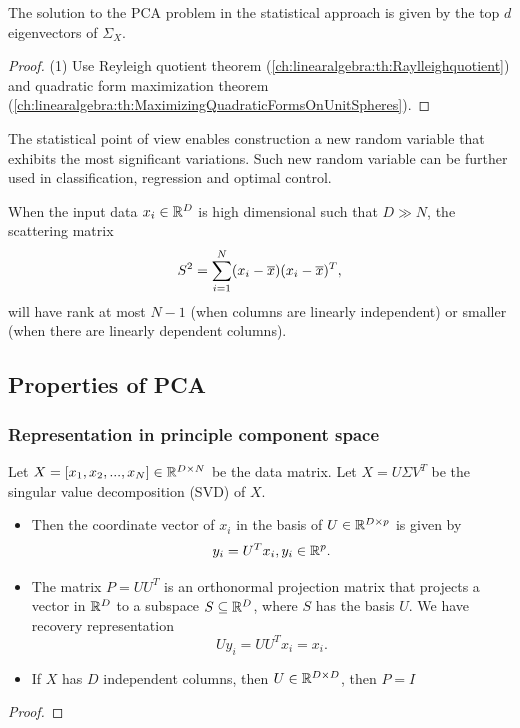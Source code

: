 \begin{refsection}
\begin{theorem}
	The solution to the PCA problem in the statistical approach is given by the top $d$ eigenvectors of $\Sigma_X$.
\end{theorem}
\begin{proof}
	(1) Use Reyleigh quotient theorem (\autoref{ch:linearalgebra:th:Raylleighquotient}) and quadratic form maximization theorem (\autoref{ch:linearalgebra:th:MaximizingQuadraticFormsOnUnitSpheres}). 
\end{proof}


\begin{remark}[implications]
	The statistical point of view enables construction a new random variable that exhibits the most significant variations. Such new random variable can be further used in classification, regression and optimal control.
\end{remark}



\begin{remark}
When the input data $x_i \in \mathbb{R}^D$ is high dimensional such that $D\gg N$, the scattering matrix 	
	$$S^2 = \sum_{i=1}^N (x_i - \overline{x})(x_i - \overline{x})^T,$$
will have rank at most $N-1$ (when columns are linearly independent) or smaller (when there are linearly dependent columns). 	
\end{remark}





\subsection{Properties of PCA}
\subsubsection{Representation in principle component space}

\begin{lemma}
Let $X = [x_1,x_2,...,x_N] \in \mathbb{R}^{D\times N}$ be the data matrix. Let $X = U\Sigma V^T$ be the singular value decomposition (SVD) of $X$. 
\begin{itemize}
	\item Then the coordinate vector of $x_i$ in the basis of $U\in \mathbb{R}^{D\times p}$ is given by
	$$y_i = U^Tx_i, y_i\in \mathbb{R}^p.$$
	\item The matrix $P=UU^T$ is an orthonormal projection matrix that projects a vector in $\mathbb{R}^D$ to a subspace $S\subseteq \mathbb{R}^D$, where $S$ has the basis $U$. We have recovery representation
	$$Uy_i = UU^Tx_i = x_i.$$
	\item If $X$ has $D$ independent columns, then $U\in \mathbb{R}^{D\times D}$, then $P = I$
\end{itemize}
\end{lemma}
\begin{proof}


\end{proof}
\end{refsection}
